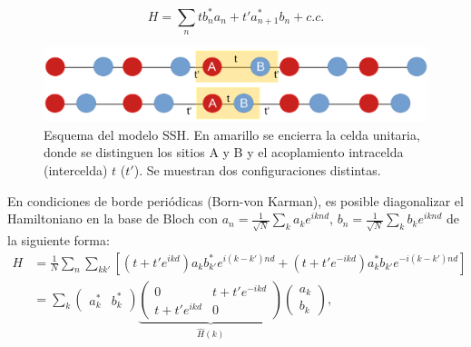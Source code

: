 \begin{equation*}
	H = \sum_n t b_n^*a_n + t'  a_{n+1}^*b_n  + c.c.
\end{equation*}



\begin{figure}[h]
\centering
	\includegraphics[width=\linewidth]{media/ssh-model.png}
	\caption[Esquema del modelo SSH.]{Esquema del modelo SSH. En amarillo se encierra la celda unitaria, donde se distinguen los sitios A y B y el acoplamiento intracelda (intercelda) $t$ ($t'$). Se muestran dos configuraciones distintas. \label{fig:ssh-model}}
\end{figure}
En condiciones de borde periódicas (Born-von Karman), es posible diagonalizar el Hamiltoniano en la base de Bloch con $a_n = \frac{1}{\sqrt{N}}\sum_k a_k e^{iknd}$, $b_n = \frac{1}{\sqrt{N}}\sum_k b_k e^{iknd}$ de la siguiente forma:
\begin{align*}
	H &= \frac{1}{N}\sum_n \sum_{k k'} \left[\left(t + t' e^{ikd}\right) a_k b_{k'}^* e^{i(k-k')nd}  + \left(t  + t' e^{-ikd}\right) a_k^* b_{k'} e^{-i(k-k')nd} \right]
	\\
	&=  \sum_k 
	\begin{pmatrix}
		a_k^* & b_k^*		
	\end{pmatrix}
	\underbrace{
	\begin{pmatrix}
		0 & t+ t'e^{-ikd}
		\\
		t+ t'e^{ikd} & 0
	\end{pmatrix}}_{\hat{H}(k)}
	\begin{pmatrix}
		a_k
		\\
		b_k		
	\end{pmatrix},
\end{align*}
